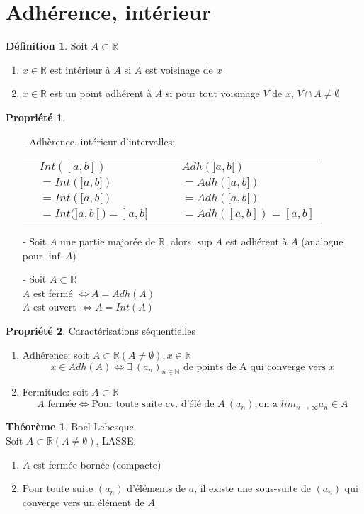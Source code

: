 \documentclass[fleqn]{article}
\theoremstyle{definition} \newtheorem*{defi}{D\'efinition}
\theoremstyle{definition} \newtheorem*{theo}{Th\'eor\`eme}
\theoremstyle{definition} \newtheorem*{adh}{Caract\'erisation s\'equentielle de l'adh\'erence}
\theoremstyle{definition} \newtheorem*{prop}{Propri\'et\'e}
\theoremstyle{definition} \newtheorem*{fermitude}{Caract\'erisation s\'equentielle de la fermitude}
\begin{document}
\section{Adh\'erence, int\'erieur}
\begin{defi}
	Soit $A \subset \mathbb{R}$
	\begin{enumerate}
		\item $x \in \mathbb{R}$ est int\'erieur \`a $A$ si $A$ est voisinage de $x$
		\item $x \in \mathbb{R}$ est un point adh\'erent \`a $A$ si pour tout voisinage $V$ de $x$, $V \cap A \neq \emptyset$
	\end{enumerate}
\end{defi}

\begin{prop} $ $
	\begin{itemize}
		\item [-] Adh\`erence, int\'erieur d'intervalles: \\
		\begin{tabular}{@{}ll@{}}
				$\quad Int([a,b])$ & $\quad \quad Adh(]a,b[)$ \\
				$\quad = Int(]a,b])$ & $\quad \quad = Adh(]a,b])$ \\
				$\quad = Int([a,b[)$ & $\quad \quad = Adh([a,b[)$ \\
				$\quad = Int(]a,b[) = ]a,b[$ & $\quad \quad = Adh([a,b]) = [a,b]$ \\
		\end{tabular}
		\item [-] Soit $A$ une partie major\'ee de $\mathbb{R}$, alors $\sup A$ est adh\'erent \`a $A$ (analogue pour $\inf\ A$)
		\item [-] Soit $A \subset \mathbb{R}$ \\
			$A$ est ferm\'e $\Leftrightarrow A = Adh(A)$ \\
			$A$ est ouvert $\Leftrightarrow A = Int(A)$
	\end{itemize}
\end{prop}
\begin{prop} Caract\'erisations s\'equentielles
	\begin{enumerate}
		\item Adh\'erence: soit $A \subset \mathbb{R} (A \neq \emptyset), x \in \mathbb{R}$
			\[x \in Adh(A) \Leftrightarrow \exists\ (a_n)_{n \in \mathbb{N}} \text{ de points de A qui converge vers } x\]
		\item Fermitude: soit $A \subset \mathbb{R}$
			\[A \text{ ferm\'ee} \Leftrightarrow \text{Pour toute suite cv. d'\'el\'e de } A\ (a_n), \text{on a } lim_{n \to \infty} a_n \in A\]
	\end{enumerate}
\end{prop}
\begin{theo}
	Boel-Lebesque \\ Soit $A \subset \mathbb{R} (A \neq \emptyset)$, LASSE:
	\begin{enumerate}
		\item $A$ est ferm\'ee born\'ee (compacte)
		\item Pour toute suite $(a_n)$ d'\'el\'ements de $a$, il existe une sous-suite de $(a_n)$ qui converge vers un \'el\'ement de $A$
	\end{enumerate}
\end{theo}
\end{document}
